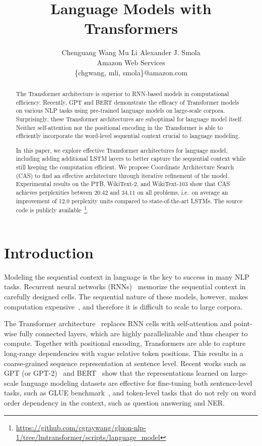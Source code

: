 \documentclass[11pt,a4paper]{article}
\title{Language Models with Transformers}
\author{
 Chenguang Wang \qquad Mu Li \qquad Alexander J. Smola \\
  Amazon Web Services \\
  {\sf \{chgwang, mli, smola\}@amazon.com} \\
}
\date{}
\begin{document}
\maketitle

\begin{abstract}
    
The Transformer architecture is superior to RNN-based models in computational efficiency. Recently, GPT and BERT demonstrate the efficacy of Transformer models on various NLP tasks using pre-trained language models on large-scale corpora. Surprisingly, these Transformer architectures are suboptimal for language model itself. Neither self-attention nor the positional encoding in the Transformer is able to efficiently incorporate the word-level sequential context crucial to language modeling. 

In this paper, we explore effective Transformer architectures for language model, including adding additional LSTM layers to better capture the sequential context while still keeping the computation efficient. We propose Coordinate Architecture Search (CAS) to find an effective architecture through iterative refinement of the model. Experimental results on the PTB, WikiText-2, and WikiText-103 show that CAS achieves perplexities between $20.42$ and $34.11$ on all problems, i.e.\ on average an improvement of 12.0 perplexity units compared to state-of-the-art LSTMs. The source code is publicly available~\footnote{\url{https://github.com/cgraywang/gluon-nlp-1/tree/lmtransformer/scripts/language_model}}.

\end{abstract} \section{Introduction}

Modeling the sequential context in language is the key to success in many NLP tasks. Recurrent neural networks (RNNs)~\cite{mikolov2010recurrent} memorize the sequential context in carefully designed cells. The sequential nature of these models, however, makes computation expensive~\cite{Merity02182,Yang03953}, and therefore it is difficult to scale to large corpora.

The Transformer architecture~\cite{vaswani2017attention} replaces RNN cells with self-attention and point-wise fully connected layers, which are highly parallelizable and thus cheaper to compute. Together with positional encoding, Transformers are able to capture long-range dependencies with vague relative token positions. This results in a coarse-grained sequence representation at sentence level. Recent works such as GPT (or GPT-2)~\cite{radford2018improving,radford2019language} and BERT~\cite{devlin2018bert} show that the representations learned on large-scale language modeling datasets are effective for fine-tuning both sentence-level tasks, such as GLUE benchmark~\cite{wang2018glue}, and token-level tasks that do not rely on word order dependency in the context, such as question answering and NER.
\end{document}
